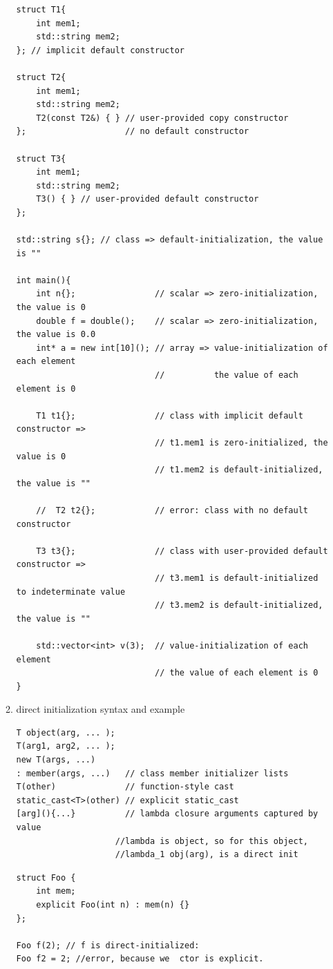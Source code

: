 \documentclass[a4paper,11pt,twoside]{book}
\begin{document}
\begin{itemize}
\begin{enumerate}
\begin{lstlisting}
struct T1{
	int mem1;
	std::string mem2;
}; // implicit default constructor

struct T2{
	int mem1;
	std::string mem2;
	T2(const T2&) { } // user-provided copy constructor
};                    // no default constructor

struct T3{
	int mem1;
	std::string mem2;
	T3() { } // user-provided default constructor
};

std::string s{}; // class => default-initialization, the value is ""

int main(){
	int n{};                // scalar => zero-initialization, the value is 0
	double f = double();    // scalar => zero-initialization, the value is 0.0
	int* a = new int[10](); // array => value-initialization of each element
							//          the value of each element is 0
							
	T1 t1{};                // class with implicit default constructor =>
							// t1.mem1 is zero-initialized, the value is 0
							// t1.mem2 is default-initialized, the value is ""
							
	//  T2 t2{};            // error: class with no default constructor
	
	T3 t3{};                // class with user-provided default constructor =>
							// t3.mem1 is default-initialized to indeterminate value
							// t3.mem2 is default-initialized, the value is ""
							
	std::vector<int> v(3);  // value-initialization of each element
							// the value of each element is 0
}
\end{lstlisting}


		\item direct initialization syntax and example
\begin{lstlisting}[numbers=none]
T object(arg, ... );
T(arg1, arg2, ... );
new T(args, ...)
: member(args, ...)   // class member initializer lists
T(other)              // function-style cast
static_cast<T>(other) // explicit static_cast
[arg](){...}          // lambda closure arguments captured by value
					//lambda is object, so for this object, 
					//lambda_1 obj(arg), is a direct init
\end{lstlisting}



\begin{lstlisting}[numbers=none]
struct Foo {
	int mem;
	explicit Foo(int n) : mem(n) {}
};

Foo f(2); // f is direct-initialized:
Foo f2 = 2; //error, because we  ctor is explicit.
\end{lstlisting}



\end{enumerate}
\end{itemize}
\end{document}
